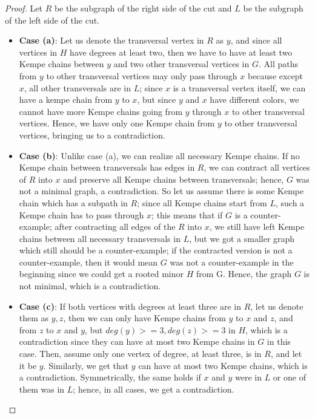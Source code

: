 \begin{proof}
 Let $R$ be the subgraph of the right side of the cut and $L$ be the subgraph of the left side of the cut.
 
 \begin{itemize}
    \item \textbf{Case (a)}: 
    Let us denote the transversal vertex in $R$ as $y$, and since 
 all vertices in $H$ have degrees at least two, then we have to have at least two Kempe chains between $y$ and two other transversal vertices in $G$. All paths from $y$ to other transversal vertices may only pass through
    $x$ because except $x$, all other transversals are in $L$; since $x$ is a transversal vertex itself, we can have a kempe chain from $y$ to $x$, but since $y$ and $x$ have different
 colors, we cannot have more Kempe chains going from $y$ through $x$ to other transversal vertices. Hence, we have only one Kempe chain from $y$ to other transversal vertices, bringing us to a contradiction.


    \item \textbf{Case (b)}: 
    Unlike case (a), we can realize all necessary Kempe chains. If no Kempe chain between transversals has edges in $R$, we can contract
 all vertices of $R$ into $x$ and preserve all Kempe chains between transversals; hence, $G$ was not a minimal graph, a contradiction.
 So let us assume there is some Kempe chain which has a subpath in $R$; since all Kempe chains start from $L$, such a Kempe chain has to pass through $x$; this means that if 
    $G$ is a counter-example; after contracting all edges of the $R$ into $x$, we still have left Kempe chains between all necessary transversals in $L$, but we got a smaller graph
 which still should be a counter-example; if the contracted version is not a counter-example, then it would mean $G$ was not a counter-example in the beginning since we could get a 
 rooted minor $H$ from G. Hence, the graph $G$ is not minimal, which is a contradiction.

    \item \textbf{Case (c)}: 
    If both vertices with degrees at least three are in $R$, let us denote them as $y, z$, then we can only have Kempe chains from $y$
 to $x$ and $z$, and from $z$ to $x$ and $y$, but $deg(y) >= 3, deg(z) >= 3$ in $H$, which is a contradiction since they can have 
 at most two Kempe chains in $G$ in this case. Then, assume only one vertex of degree, at least three, is in $R$, and let it be $y$. Similarly, we get that $y$ can have
 at most two Kempe chains, which is a contradiction. Symmetrically, the same holds if $x$ and $y$ were in $L$ or one of them was in $L$; hence, in all cases, we get a contradiction.


\end{itemize}
\end{proof}
